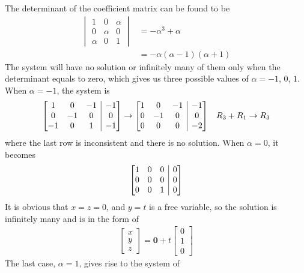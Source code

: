 \begin{Answer}
The determinant of the coefficient matrix can be found to be
\begin{align*}
\begin{vmatrix}
1 & 0 & \alpha \\
0 & \alpha & 0 \\
\alpha & 0 & 1
\end{vmatrix}
&= -\alpha^3 + \alpha \\
&= -\alpha(\alpha-1)(\alpha+1)
\end{align*}
The system will have no solution or infinitely many of them only when the determinant equals to zero, which gives us three possible values of $\alpha = -1$, $0$, $1$. When $\alpha = -1$, the system is
\begin{align*}
\left[
\begin{array}{@{}ccc|c@{}}
1 & 0 & -1 & -1\\
0 & -1 & 0 & 0 \\
-1 & 0 & 1 & -1
\end{array}
\right]
&\to
\left[
\begin{array}{@{}ccc|c@{}}
1 & 0 & -1 & -1\\
0 & -1 & 0 & 0 \\
0 & 0 & 0 & -2
\end{array}
\right] & R_3 + R_1 \to R_3
\end{align*}
where the last row is inconsistent and there is no solution. When $\alpha = 0$, it becomes
\begin{align*}
\left[
\begin{array}{@{}ccc|c@{}}
1 & 0 & 0 & 0\\
0 & 0 & 0 & 0 \\
0 & 0 & 1 & 0
\end{array}
\right]
\end{align*}
It is obvious that $x = z = 0$, and $y = t$ is a free variable, so the solution is infinitely many and is in the form of
\begin{align*}
\begin{bmatrix}
x \\
y \\
z 
\end{bmatrix}
=
\textbf{0} +
t
\begin{bmatrix}
0 \\
1 \\
0
\end{bmatrix}
\end{align*}
The last case, $\alpha = 1$, gives rise to the system of
\begin{align*}

\end{align*}
\end{Answer}
